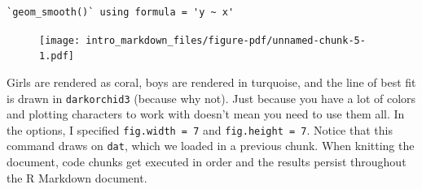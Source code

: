 \documentclass[
  letterpaper,
  DIV=11,
  numbers=noendperiod]{scrreprt}
\newenvironment{Shaded}{\begin{snugshade}}{\end{snugshade}}
\newcommand{\AttributeTok}[1]{\textcolor[rgb]{0.49,0.56,0.16}{#1}}
\newcommand{\ConstantTok}[1]{\textcolor[rgb]{0.53,0.00,0.00}{#1}}
\newcommand{\DecValTok}[1]{\textcolor[rgb]{0.25,0.63,0.44}{#1}}
\newcommand{\FunctionTok}[1]{\textcolor[rgb]{0.02,0.16,0.49}{#1}}
\newcommand{\NormalTok}[1]{\textcolor[rgb]{0.00,0.44,0.13}{#1}}
\newcommand{\OtherTok}[1]{\textcolor[rgb]{0.00,0.44,0.13}{#1}}
\newcommand{\SpecialCharTok}[1]{\textcolor[rgb]{0.25,0.44,0.63}{#1}}
\newcommand{\StringTok}[1]{\textcolor[rgb]{0.25,0.44,0.63}{#1}}
\begin{document}
\begin{Shaded}
\end{Shaded}

\begin{verbatim}
`geom_smooth()` using formula = 'y ~ x'
\end{verbatim}

\begin{figure}[H]

{\centering \texttt{[image: intro\_markdown\_files/figure-pdf/unnamed-chunk-5-1.pdf]}

}

\end{figure}

Girls are rendered as coral, boys are rendered in turquoise, and the
line of best fit is drawn in \texttt{darkorchid3} (because why not).
Just because you have a lot of colors and plotting characters to work
with doesn't mean you need to use them all. In the options, I specified
\texttt{fig.width\ =\ 7} and \texttt{fig.height\ =\ 7}. Notice that this
command draws on \texttt{dat}, which we loaded in a previous chunk. When
knitting the document, code chunks get executed in order and the results
persist throughout the R Markdown document.
\end{document}
